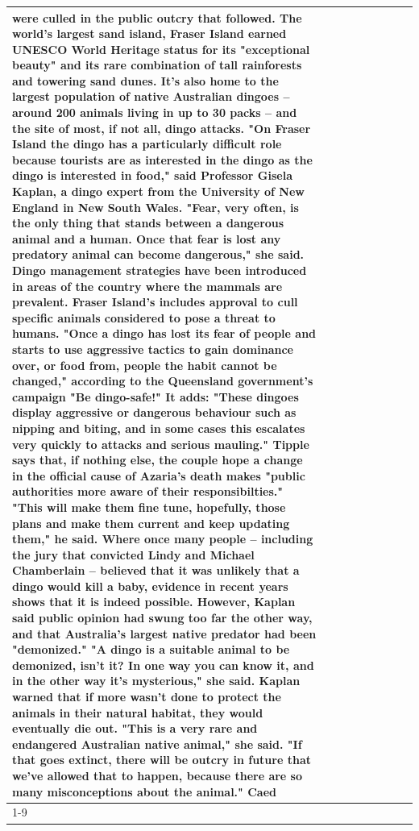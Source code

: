 \begin{table}[H]
\begin{tabular}{lllrlllll}
were culled in the public outcry that followed. The world's largest sand island, Fraser Island earned UNESCO World Heritage status for its "exceptional beauty" and its rare combination of tall rainforests and towering sand dunes. It's also home to the largest population of native Australian dingoes -- around 200 animals living in up to 30 packs -- and the site of most, if not all, dingo attacks. "On Fraser Island the dingo has a particularly difficult role because tourists are as interested in the dingo as the dingo is interested in food," said Professor Gisela Kaplan, a dingo expert from the University of New England in New South Wales. "Fear, very often, is the only thing that stands between a dangerous animal and a human. Once that fear is lost any predatory animal can become dangerous," she said. Dingo management strategies have been introduced in areas of the country where the mammals are prevalent. Fraser Island's includes approval to cull specific animals considered to pose a threat to humans. "Once a dingo has lost its fear of people and starts to use aggressive tactics to gain dominance over, or food from, people the habit cannot be changed," according to the Queensland government's campaign "Be dingo-safe!" It adds: "These dingoes display aggressive or dangerous behaviour such as nipping and biting, and in some cases this escalates very quickly to attacks and serious mauling." Tipple says that, if nothing else, the couple hope a change in the official cause of Azaria's death makes "public authorities more aware of their responsibilties." "This will make them fine tune, hopefully, those plans and make them current and keep updating them," he said. Where once many people -- including the jury that convicted Lindy and Michael Chamberlain -- believed that it was unlikely that a dingo would kill a baby, evidence in recent years shows that it is indeed possible. However, Kaplan said public opinion had swung too far the other way, and that Australia's largest native predator had been "demonized." "A dingo is a suitable animal to be demonized, isn't it? In one way you can know it, and in the other way it's mysterious," she said. Kaplan warned that if more wasn't done to protect the animals in their natural habitat, they would eventually die out. "This is a very rare and endangered Australian native animal," she said. "If that goes extinct, there will be outcry in future that we've allowed that to happen, because there are so many misconceptions about the animal." Caed \\
\cline{1-9}

\end{tabular}
\end{table}
